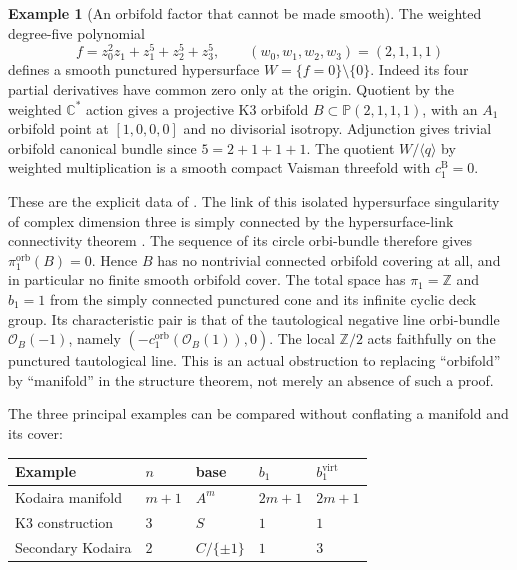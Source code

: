 \documentclass[12pt]{amsart}
\theoremstyle{definition}
\newtheorem{eg}[thm]{Example}
\theoremstyle{remark}
\numberwithin{equation}{section}
\newcommand{\cO}{\mathcal{O}}
\newcommand{\orb}{\mathrm{orb}}
\newcommand{\Z}{\mathbb{Z}}
\newcommand{\C}{\mathbb{C}}
\newcommand{\mP}{\mathbb{P}}
\newcommand{\bas}{\mathrm{B}}
\newcommand{\virt}{\mathrm{virt}}
\begin{document}
\begin{eg}[An orbifold factor that cannot be made smooth]\label{eg:orb}
The weighted degree-five polynomial
\[
f=z_0^2z_1+z_1^5+z_2^5+z_3^5,
\qquad (w_0,w_1,w_2,w_3)=(2,1,1,1)
\]
defines a smooth punctured hypersurface $W=\{f=0\}\setminus\{0\}$.
Indeed its four partial derivatives have common zero only at the
origin. Quotient by the weighted $\C^*$ action gives a projective
K3 orbifold $B\subset\mP(2,1,1,1)$, with an $A_1$ orbifold point
at $[1,0,0,0]$ and no divisorial isotropy. Adjunction gives trivial
orbifold canonical bundle since $5=2+1+1+1$. The quotient
$W/\langle q\rangle$ by weighted multiplication is a smooth compact
Vaisman threefold with $c_1^{\bas}=0$.

These are the explicit data of \cite[Example 7.4]{Istrati}. The link
of this isolated hypersurface singularity of complex dimension three
is simply connected by the hypersurface-link connectivity theorem
\cite[Chapter 5]{Milnor}. The sequence of its circle orbi-bundle
therefore gives $\pi_1^{\orb}(B)=0$. Hence $B$ has no nontrivial
connected orbifold covering at all, and in particular no finite smooth
orbifold cover. The total space has $\pi_1=\Z$ and $b_1=1$ from
the simply connected punctured cone and its infinite cyclic deck group.
Its characteristic pair is that of the tautological negative line
orbi-bundle $\cO_B(-1)$, namely $(-c_1^{\orb}(\cO_B(1)),0)$.
The local $\Z/2$ acts faithfully on the punctured tautological line.
This is an actual obstruction to replacing ``orbifold'' by ``manifold''
in the structure theorem, not merely an absence of such a proof.
\end{eg}

The three principal examples can be compared without conflating a
manifold and its cover:
\begin{center}\small
\begin{tabular}{lllll}\toprule
Example & $n$ & base & $b_1$ & $b_1^{\virt}$\\\midrule
Kodaira manifold & $m+1$ & $A^m$ & $2m+1$ & $2m+1$\\
K3 construction & $3$ & $S$ & $1$ & $1$\\
Secondary Kodaira & $2$ & $C/\{\pm1\}$ & $1$ & $3$\\\bottomrule
\end{tabular}
\end{center}
\end{document}
